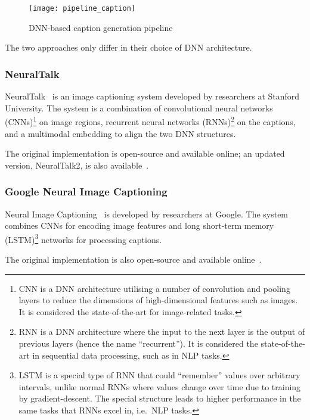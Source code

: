 \begin{figure}[ht]
\begin{center}
    \texttt{[image: pipeline\_caption]}
    \caption{DNN-based caption generation pipeline}\label{dnn-cap}
\end{center}
\end{figure}

The two approaches only differ in their choice of DNN architecture.

\subsubsection{NeuralTalk}

NeuralTalk~\cite{nrtalk} is an image captioning system developed by researchers
at Stanford University. The system is a combination of convolutional neural
networks (CNNs)\footnote{CNN is a DNN architecture utilising a number of
convolution and pooling layers to reduce the dimensions of high-dimensional
features such as images. It is considered the state-of-the-art for image-related
tasks.} on image regions, recurrent neural networks (RNNs)\footnote{RNN is a DNN
architecture where the input to the next layer is the output of previous layers
(hence the name ``recurrent''). It is considered the state-of-the-art in
sequential data processing, such as in NLP tasks.} on the captions, and a
multimodal embedding to align the two DNN structures.

The original implementation is open-source and available online; an updated
version, NeuralTalk2, is also available~\cite{gh-nrtalk,gh-nrtalk2}.

\subsubsection{Google Neural Image Captioning}

Neural Image Captioning~\cite{google-img} is developed by researchers at Google.
The system combines CNNs for encoding image features and long short-term memory
(LSTM)\footnote{LSTM is a special type of RNN that could ``remember'' values over
arbitrary intervals, unlike normal RNNs where values change over time due to
training by gradient-descent. The special structure leads to higher performance
in the same tasks that RNNs excel in, i.e.\ NLP tasks.} networks for processing
captions.

The original implementation is also open-source and available
online~\cite{gh-google-img}.

